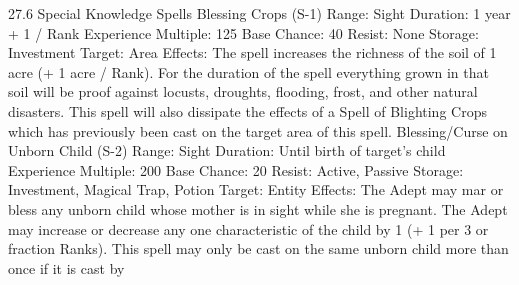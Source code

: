 \documentclass[a4paper]{article}
\begin{document}
\begin{multicols}{3}
27.6 Special Knowledge Spells
Blessing Crops (S-1)
Range: Sight
Duration: 1 year + 1 / Rank
Experience Multiple: 125
Base Chance: 40%
Resist: None
Storage: Investment
Target: Area
Effects: The spell increases the richness of the soil
of 1 acre (+ 1 acre / Rank). For the duration of the
spell everything grown in that soil will be proof
against locusts, droughts, flooding, frost, and other
natural disasters. This spell will also dissipate the
effects of a Spell of Blighting Crops which has
previously been cast on the target area of this spell.
Blessing/Curse on Unborn Child (S-2)
Range: Sight
Duration: Until birth of target’s child
Experience Multiple: 200
Base Chance: 20%
Resist: Active, Passive
Storage: Investment, Magical Trap, Potion
Target: Entity
Effects: The Adept may mar or bless any unborn
child whose mother is in sight while she is pregnant. The Adept may increase or decrease any one
characteristic of the child by 1 (+ 1 per 3 or fraction Ranks). This spell may only be cast on the
same unborn child more than once if it is cast by


\end{multicols}
\end{document}
